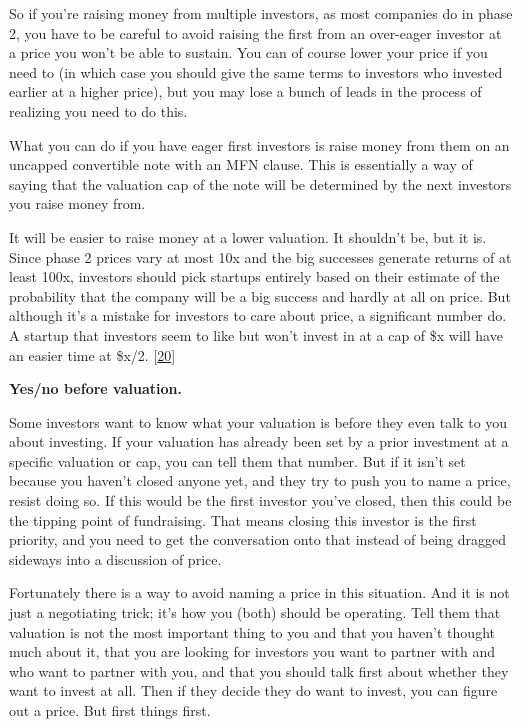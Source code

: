 So if you're raising money from multiple investors, as most companies do
in phase 2, you have to be careful to avoid raising the first from an
over-eager investor at a price you won't be able to sustain. You can of
course lower your price if you need to (in which case you should give
the same terms to investors who invested earlier at a higher price), but
you may lose a bunch of leads in the process of realizing you need to do
this.

What you can do if you have eager first investors is raise money from
them on an uncapped convertible note with an MFN clause. This is
essentially a way of saying that the valuation cap of the note will be
determined by the next investors you raise money from.

It will be easier to raise money at a lower valuation. It shouldn't be,
but it is. Since phase 2 prices vary at most 10x and the big successes
generate returns of at least 100x, investors should pick startups
entirely based on their estimate of the probability that the company
will be a big success and hardly at all on price. But although it's a
mistake for investors to care about price, a significant number do. A
startup that investors seem to like but won't invest in at a cap of \$x
will have an easier time at \$x/2. {[}\hyperref[f20n]{20}{]}

\textbf{Yes/no before valuation.}

Some investors want to know what your valuation is before they even talk
to you about investing. If your valuation has already been set by a
prior investment at a specific valuation or cap, you can tell them that
number. But if it isn't set because you haven't closed anyone yet, and
they try to push you to name a price, resist doing so. If this would be
the first investor you've closed, then this could be the tipping point
of fundraising. That means closing this investor is the first priority,
and you need to get the conversation onto that instead of being dragged
sideways into a discussion of price.

Fortunately there is a way to avoid naming a price in this situation.
And it is not just a negotiating trick; it's how you (both) should be
operating. Tell them that valuation is not the most important thing to
you and that you haven't thought much about it, that you are looking for
investors you want to partner with and who want to partner with you, and
that you should talk first about whether they want to invest at all.
Then if they decide they do want to invest, you can figure out a price.
But first things first.

